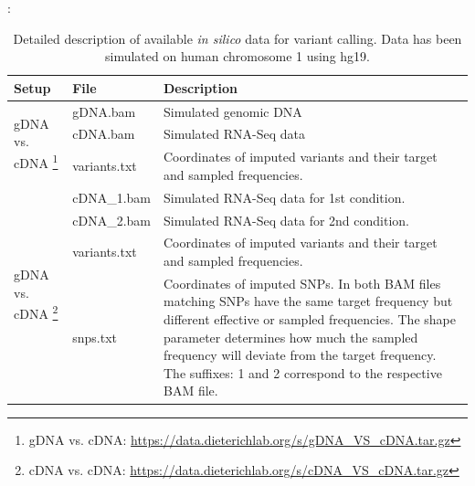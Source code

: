 \documentclass[10pt,a4paper]{article} \usepackage[utf8]{inputenc}
\begin{document}
:
\newcommand{\callRDD}{gDNA vs. cDNA: \url{https://data.dieterichlab.org/s/gDNA_VS_cDNA.tar.gz}}
\newcommand{\callRRD}{cDNA vs. cDNA: \url{https://data.dieterichlab.org/s/cDNA_VS_cDNA.tar.gz}}
\begin{table}
  \centering
  \caption{Detailed description of available \textit{in silico} data for variant calling. Data has been simulated on human chromosome 1 using hg19.}
  \label{tbl:call_data}
  {\small
  \begin{tabular}{llp{}}
    \textbf{Setup} & \textbf{File} & \textbf{Description} \\
    \hline
    \hline
    \multirow{3}{*}{gDNA vs. cDNA \footnote{\callRDD}} & gDNA.bam     & Simulated genomic DNA \\
                                                      & cDNA.bam     & Simulated RNA-Seq data \\
                                                      & variants.txt & Coordinates of imputed variants and their target 
                                                                          and sampled frequencies. \\
    \hline
    \multirow{4}{*}{gDNA vs. cDNA \footnote{\callRRD}} & cDNA\_1.bam  & Simulated RNA-Seq data for 1st condition. \\
                                                        & cDNA\_2.bam  & Simulated RNA-Seq data for 2nd condition. \\
                                                        & variants.txt & Coordinates of imputed variants and their target 
                                                                            and sampled frequencies. \\
                                                        & snps.txt     & Coordinates of imputed SNPs. In both BAM files 
                                                                            matching SNPs have the same target frequency but 
                                                                            different effective or sampled frequencies. The 
                                                                            shape parameter determines how much the sampled 
                                                                            frequency will deviate from the target frequency. 
                                                                            The suffixes: 1 and 2 correspond 
                                                                                to the respective BAM file.
  \end{tabular}}
  
\end{table}
\end{document}
